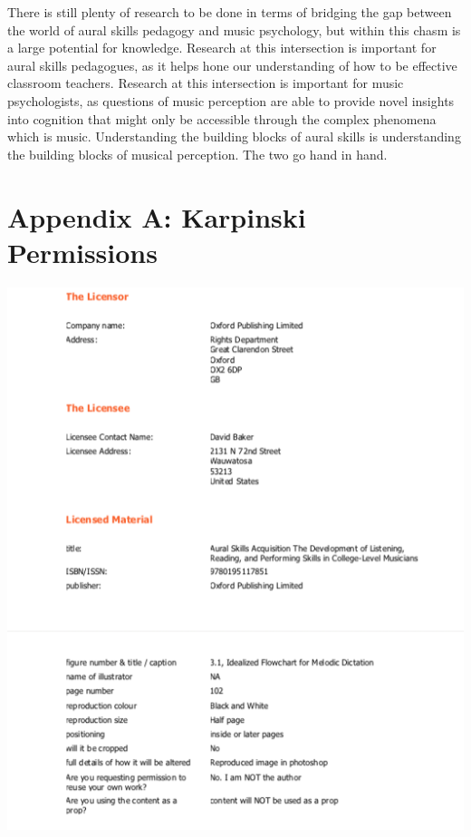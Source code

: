 \documentclass[12pt,]{book}
\begin{document}
There is still plenty of research to be done in terms of bridging the gap between the world of aural skills pedagogy and music psychology, but within this chasm is a large potential for knowledge.
Research at this intersection is important for aural skills pedagogues, as it helps hone our understanding of how to be effective classroom teachers.
Research at this intersection is important for music psychologists, as questions of music perception are able to provide novel insights into cognition that might only be accessible through the complex phenomena which is music.
Understanding the building blocks of aural skills is understanding the building blocks of musical perception.
The two go hand in hand.

\clearpage


\clearpage



\backmatter
\chapter{Appendix A: Karpinski Permissions}

\thispagestyle{empty}
\begin{center}
\includegraphics{img/karpinskipermission.png}
\end{center}
\end{document}

